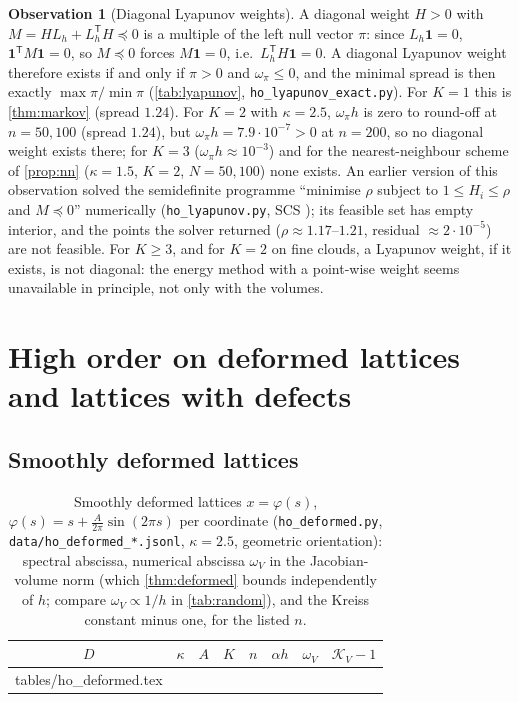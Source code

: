 \documentclass[11pt,a4paper]{article}
\makeatletter
\theoremstyle{plain}
\theoremstyle{definition}
\newtheorem{observation}[theorem]{Observation}
\theoremstyle{remark}
\numberwithin{equation}{section}
\newcommand{\inputrows}[1]{\@@input #1 }%
\makeatother
\begin{document}
\begin{observation}[Diagonal Lyapunov weights]\label{obs:lyapunov}
A diagonal weight $H>0$ with $M=HL_h+L_h^{\mathsf T}H\preceq0$ is a multiple of the left null vector $\pi$: since $L_h\mathbf 1=0$, $\mathbf 1^{\mathsf T}M\mathbf 1=0$, so $M\preceq0$ forces $M\mathbf 1=0$, i.e.\ $L_h^{\mathsf T}H\mathbf 1=0$. A diagonal Lyapunov weight therefore exists if and only if $\pi>0$ and $\omega_\pi\le0$, and the minimal spread is then exactly $\max\pi/\min\pi$ (\cref{tab:lyapunov}, \texttt{ho\_lyapunov\_exact.py}). For $K=1$ this is \cref{thm:markov} (spread $1.24$). For $K=2$ with $\kappa=2.5$, $\omega_\pi h$ is zero to round-off at $n=50,100$ (spread $1.24$), but $\omega_\pi h=7.9\cdot10^{-7}>0$ at $n=200$, so no diagonal weight exists there; for $K=3$ ($\omega_\pi h\approx10^{-3}$) and for the nearest-neighbour scheme of \cref{prop:nn} ($\kappa=1.5$, $K=2$, $N=50,100$) none exists. An earlier version of this observation solved the semidefinite programme ``minimise $\rho$ subject to $1\le H_i\le\rho$ and $M\preceq0$'' numerically (\texttt{ho\_lyapunov.py}, SCS \cite{ODonoghue2016}); its feasible set has empty interior, and the points the solver returned ($\rho\approx1.17$--$1.21$, residual $\approx2\cdot10^{-5}$) are not feasible. For $K\ge3$, and for $K=2$ on fine clouds, a Lyapunov weight, if it exists, is not diagonal: the energy method with a point-wise weight seems unavailable in principle, not only with the volumes.
\end{observation}

\section{High order on deformed lattices and lattices with defects}\label{sec:numdefects}

\subsection{Smoothly deformed lattices}

\begin{table}[t]
\centering
\caption{Smoothly deformed lattices $x=\varphi(s)$, $\varphi(s)=s+\frac{A}{2\pi}\sin(2\pi s)$ per coordinate (\texttt{ho\_deformed.py}, \texttt{data/ho\_deformed\_*.jsonl}, $\kappa=2.5$, geometric orientation): spectral abscissa, numerical abscissa $\omega_V$ in the Jacobian-volume norm (which \cref{thm:deformed} bounds independently of $h$; compare $\omega_V\propto1/h$ in \cref{tab:random}), and the Kreiss constant minus one, for the listed $n$.}\label{tab:deformed}
\footnotesize
\begin{tabular}{ccccllll}
\toprule
$D$ & $\kappa$ & $A$ & $K$ & $n$ & $\alpha h$ & $\omega_V$ & $\mathcal K_V-1$\\
\midrule
\inputrows{tables/ho_deformed.tex}
\bottomrule
\end{tabular}
\end{table}
\end{document}
